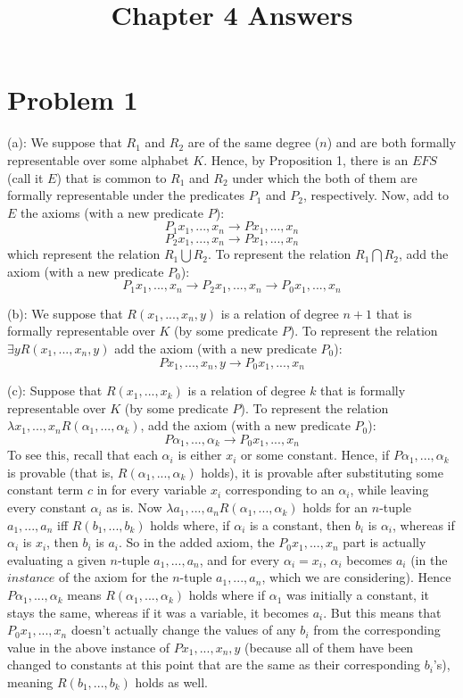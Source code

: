 \documentclass{article}
\title{Chapter 4 Answers}
\theoremstyle{definition}
\begin{document}
\date{}
\maketitle

\section*{Problem 1}
(a): We suppose that $R_1$ and $R_2$ are of the same degree ($n$) and are both formally representable over some alphabet $K$. 
Hence, by Proposition 1, there is 
an $EFS$ (call it $E$) that is common to $R_1$ and $R_2$ under which the both of them are formally representable under the predicates 
$P_1$ and $P_2$, respectively. Now, add to $E$ the axioms (with a new predicate $P$): \[ P_1x_1,...,x_n\rightarrow Px_1,...,x_n \]
 \[ P_2x_1,...,x_n\rightarrow Px_1,...,x_n \] which represent the relation $R_1\bigcup R_2$. To represent the relation 
$R_1\bigcap R_2$, add the axiom (with a new predicate $P_0$):
\[ P_1x_1,...,x_n\rightarrow P_2x_1,...,x_n\rightarrow P_0x_1,...,x_n \] 


(b): We suppose that $R\left(x_1,...,x_n,y\right)$ is a relation of degree $n+1$ 
that is formally representable over $K$ (by some predicate $P$). 
To represent the relation 
$\exists yR\left(x_1,...,x_n,y\right)$ add the axiom (with a new predicate $P_0$):
\[ Px_1,...,x_n,y\rightarrow P_0x_1,...,x_n \] 


(c): Suppose that $R\left(x_1,...,x_k\right)$ is a relation of degree $k$ that is formally representable over $K$ (by some predicate $P$). To represent the 
relation $\lambda x_1,...,x_nR\left(\alpha_1,...,\alpha_k\right)$, add the axiom (with a new predicate $P_0$):
\[ P\alpha_1,...,\alpha_k\rightarrow P_0x_1,...,x_n \]
To see this, recall that each $\alpha_i$ is either $x_i$ or some constant. Hence, if $P\alpha_1,...,\alpha_k$ is provable (that is, 
$R\left(\alpha_1,...,\alpha_k\right)$ holds), it is provable after substituting some constant term $c$ in for every variable $x_i$ corresponding to 
an $\alpha_i$, while leaving every constant $\alpha_i$ as is. Now $\lambda a_1,...,a_nR\left(\alpha_1,...,\alpha_k\right)$ holds for an $n$-tuple 
$a_1,...,a_n$ iff 
$R\left(b_1,...,b_k\right)$ holds where, if $\alpha_i$ is a constant, then $b_i$ is $\alpha_i$, whereas if $\alpha_i$ is $x_i$, then 
$b_i$ is $a_i$. So in the added axiom, the $P_0x_1,...,x_n$ part is actually evaluating a given $n$-tuple $a_1,...,a_n$, and for every 
$\alpha_i=x_i$, $\alpha_i$ becomes $a_i$ (in the $instance$ of the axiom for the $n$-tuple $a_1,...,a_n$, which we are considering). 
Hence $P\alpha_1,...,\alpha_k$ means $R\left(\alpha_1,...,\alpha_k\right)$ holds where if 
$\alpha_1$ was initially a constant, it stays the same, whereas if it was a variable, it becomes $a_i$. But this means that $P_0x_1,...,x_n$ doesn't 
actually change the values of any $b_i$ from the corresponding value in the above instance of $Px_1,...,x_n,y$ 
(because all of them have been changed to constants at this point that are the same as their corresponding $b_i$'s), meaning 
$R\left(b_1,...,b_k\right)$ holds as well. 
\end{document}
